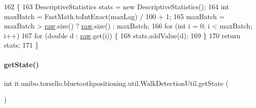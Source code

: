 \begin{DoxyCode}
162                                                                    \{
163         DescriptiveStatistics stats = \textcolor{keyword}{new} DescriptiveStatistics();
164         \textcolor{keywordtype}{int} maxBatch = FastMath.toIntExact(maxLag) / 100 + 1;
165         maxBatch = maxBatch > \hyperlink{classit_1_1unibo_1_1torsello_1_1bluetoothpositioning_1_1util_1_1WalkDetectionUtil_a985270e2b9d4202985cb987eef136a9e_a985270e2b9d4202985cb987eef136a9e}{raw}.size() ? \hyperlink{classit_1_1unibo_1_1torsello_1_1bluetoothpositioning_1_1util_1_1WalkDetectionUtil_a985270e2b9d4202985cb987eef136a9e_a985270e2b9d4202985cb987eef136a9e}{raw}.size() : maxBatch;
166         \textcolor{keywordflow}{for} (\textcolor{keywordtype}{int} i = 0; i < maxBatch; i++)
167             \textcolor{keywordflow}{for} (\textcolor{keywordtype}{double} d : \hyperlink{classit_1_1unibo_1_1torsello_1_1bluetoothpositioning_1_1util_1_1WalkDetectionUtil_a985270e2b9d4202985cb987eef136a9e_a985270e2b9d4202985cb987eef136a9e}{raw}.get(i)) \{
168                 stats.addValue(d);
169             \}
170         \textcolor{keywordflow}{return} stats;
171     \}
\end{DoxyCode}
\hypertarget{classit_1_1unibo_1_1torsello_1_1bluetoothpositioning_1_1util_1_1WalkDetectionUtil_a86e38be742e0e20a92b4195d8d98a08d_a86e38be742e0e20a92b4195d8d98a08d}{}\label{classit_1_1unibo_1_1torsello_1_1bluetoothpositioning_1_1util_1_1WalkDetectionUtil_a86e38be742e0e20a92b4195d8d98a08d_a86e38be742e0e20a92b4195d8d98a08d} 
\paragraph{\texorpdfstring{get\+State()}{getState()}}
{\footnotesize\ttfamily int it.\+unibo.\+torsello.\+bluetoothpositioning.\+util.\+Walk\+Detection\+Util.\+get\+State (\begin{DoxyParamCaption}{ }\end{DoxyParamCaption})}


